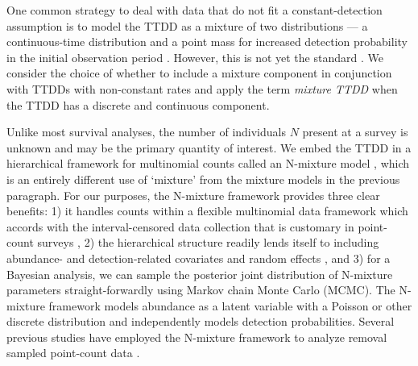 \documentclass[12pt]{article}
\begin{document}
One common strategy to deal with data that do not fit a constant-detection assumption is to model the TTDD as a mixture of two distributions --- a continuous-time distribution and a point mass for increased detection probability in the initial observation period \citep{Farnsworth2002, Farnsworth2005, EffordDawson2009, Etterson2009, Reidy2011}.
However, this is not yet the standard \citep{Solymos2013, Amundson2014, Reidy2016}. 
We consider the choice of whether to include a mixture component in conjunction with TTDDs with non-constant rates
and apply the term \emph{mixture TTDD} when the TTDD has a discrete and continuous component.

Unlike most survival analyses, the number of individuals $N$ present at a survey is unknown and may be the primary quantity of interest.  
We embed the TTDD in a hierarchical framework for multinomial counts called an N-mixture model \citep{Wyatt2002, Royle2004NMixture}, which is an entirely different use of `mixture' from the mixture models in the previous paragraph. 
For our purposes, the N-mixture framework provides three clear benefits: 1) it handles counts within a flexible multinomial data framework \citep{RoyleDorazio2006} which accords with the interval-censored data collection that is customary in point-count surveys \citep{Ralph1995}, 2) the hierarchical structure readily lends itself to including abundance- and detection-related covariates and random effects \citep{Dorazio2005, Etterson2009, Amundson2014}, and 3) for a Bayesian analysis, we can sample the posterior joint distribution of N-mixture parameters straight-forwardly using Markov chain Monte Carlo (MCMC).  
The N-mixture framework models abundance as a latent variable with a Poisson or other discrete distribution and independently models detection probabilities.  
Several previous studies have employed the N-mixture framework to analyze removal sampled point-count data  \citep{Royle2004Generalized, Dorazio2005, Etterson2009, Solymos2013, Amundson2014, Reidy2016}.  



\end{document}
